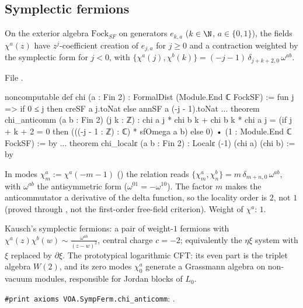 \subsection{Symplectic fermions}\label{l17:sec:sf}

\begin{definition}\label{l17:def:chi}
On the exterior algebra $\mathrm{Fock}_{SF}$ on generators $e_{k,a}$ ($k\in\N$, $a\in\{0,1\}$), the
fields $\chi^a(z)$ have $z^j$-coefficient creation of $e_{j,a}$ for $j\ge0$ and a contraction weighted by
the symplectic form for $j<0$, with
$\{\chi^a(j),\chi^b(k)\}=(-j-1)\,\delta_{j+k+2,0}\,\omega^{ab}$.
\end{definition}
\noindent File .
\begin{leancode}
noncomputable def chi (a : Fin 2) : FormalDist (Module.End ℂ FockSF) :=
  fun j => if 0 ≤ j then creSF a j.toNat else annSF a (-j - 1).toNat
...
theorem chi_anticomm (a b : Fin 2) (j k : ℤ) :
    chi a j * chi b k + chi b k * chi a j
      = (if j + k + 2 = 0 then (((-j - 1 : ℤ) : ℂ) * sfOmega a b) else 0)
        • (1 : Module.End ℂ FockSF) := by
...
theorem chi_localε (a b : Fin 2) : Localε (-1) (chi a) (chi b) := by
\end{leancode}
\begin{dictionary}
In modes $\chi^a_m:=\chi^a(-m-1)$ () the relation reads $\{\chi^a_m,\chi^b_n\}=m\,\delta_{m+n,0}\,\omega^{ab}$,
with $\omega^{ab}$ the antisymmetric form  ($\omega^{01}=-\omega^{10}$). The factor $m$
makes the anticommutator a derivative of the delta function, so the locality order is $2$, not $1$
(proved through , not the first-order free-field criterion). Weight of $\chi^a$: $1$.
\end{dictionary}
\begin{physics}
Kausch's symplectic fermions: a pair of weight-$1$ fermions with $\chi^a(z)\chi^b(w)\sim\frac{\omega^{ab}}{(z-w)^2}$,
central charge $c=-2$; equivalently the $\eta\xi$ system with $\xi$ replaced by $\partial\xi$. The
prototypical logarithmic CFT: its even part is the triplet algebra $W(2)$, and its zero modes
$\chi^a_0$ generate a Grassmann algebra on non-vacuum modules, responsible for Jordan blocks of $L_0$.
\end{physics}
\begin{status}
\texttt{\#print axioms VOA.SympFerm.chi\_anticomm}: .
\end{status}

